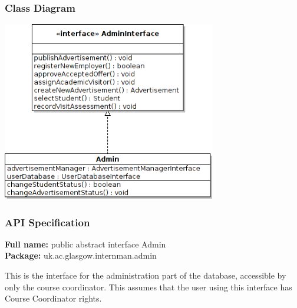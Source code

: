 \documentclass[11pt]{article}
\begin{document}
\subsubsection{Class Diagram}
\begin{centering}
  \includegraphics[width=0.7\textwidth]{adminClassDiagram.png}
\end{centering}
\subsubsection{API Specification}

\textbf{Full name:} public abstract interface Admin\\

\textbf{Package:} uk.ac.glasgow.internman.admin

This is the interface for the administration part of the database, accessible by
only the course coordinator.
This assumes that the user using this interface has Course Coordinator
rights.
\end{document}
